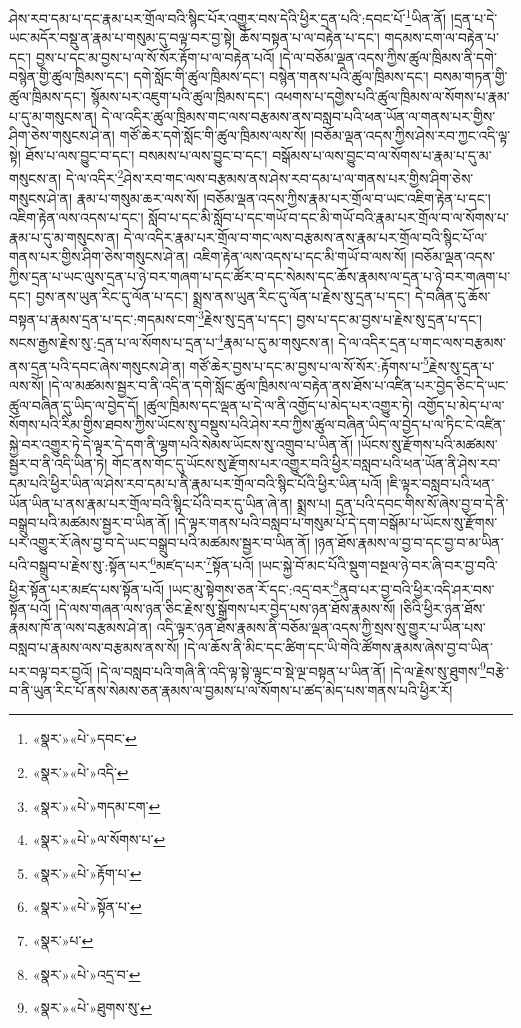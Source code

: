 ཤེས་རབ་དམ་པ་དང་རྣམ་པར་གྲོལ་བའི་སྙིང་པོར་འགྱུར་བས་དེའི་ཕྱིར་དྲན་པའི་:དབང་པོ་\footnote{«སྣར་»«པེ་»དབང་}ཡིན་ནོ། །དྲན་པ་དེ་ཡང་མདོར་བསྡུ་ན་རྣམ་པ་གསུམ་དུ་བལྟ་བར་བྱ་སྟེ། ཆོས་བསྟན་པ་ལ་བརྟེན་པ་དང་། གདམས་ངག་ལ་བརྟེན་པ་དང་། བྱས་པ་དང་མ་བྱས་པ་ལ་སོ་སོར་རྟོག་པ་ལ་བརྟེན་པའོ། །དེ་ལ་བཅོམ་ལྡན་འདས་ཀྱིས་ཚུལ་ཁྲིམས་ནི་དགེ་བསྙེན་གྱི་ཚུལ་ཁྲིམས་དང་། དགེ་སློང་གི་ཚུལ་ཁྲིམས་དང་། བསྙེན་གནས་པའི་ཚུལ་ཁྲིམས་དང་། བསམ་གཏན་གྱི་ཚུལ་ཁྲིམས་དང་། སྙོམས་པར་འཇུག་པའི་ཚུལ་ཁྲིམས་དང་། འཕགས་པ་དགྱེས་པའི་ཚུལ་ཁྲིམས་ལ་སོགས་པ་རྣམ་པ་དུ་མ་གསུངས་ན། དེ་ལ་འདིར་ཚུལ་ཁྲིམས་གང་ལས་བརྩམས་ནས་བསླབ་པའི་ཕན་ཡོན་ལ་གནས་པར་གྱིས་ཤིག་ཅེས་གསུངས་ཤེ་ན། གཙོ་ཆེར་དགེ་སློང་གི་ཚུལ་ཁྲིམས་ལས་སོ། །བཅོམ་ལྡན་འདས་ཀྱིས་ཤེས་རབ་ཀྱང་འདི་ལྟ་སྟེ། ཐོས་པ་ལས་བྱུང་བ་དང་། བསམས་པ་ལས་བྱུང་བ་དང་། བསྒོམས་པ་ལས་བྱུང་བ་ལ་སོགས་པ་རྣམ་པ་དུ་མ་གསུངས་ན། དེ་ལ་འདིར་\footnote{«སྣར་»«པེ་»འདི་}ཤེས་རབ་གང་ལས་བརྩམས་ནས་ཤེས་རབ་དམ་པ་ལ་གནས་པར་གྱིས་ཤིག་ཅེས་གསུངས་ཤེ་ན། རྣམ་པ་གསུམ་ཆར་ལས་སོ། །བཅོམ་ལྡན་འདས་ཀྱིས་རྣམ་པར་གྲོལ་བ་ཡང་འཇིག་རྟེན་པ་དང་། འཇིག་རྟེན་ལས་འདས་པ་དང་། སློབ་པ་དང་མི་སློབ་པ་དང་གཡོ་བ་དང་མི་གཡོ་བའི་རྣམ་པར་གྲོལ་བ་ལ་སོགས་པ་རྣམ་པ་དུ་མ་གསུངས་ན། དེ་ལ་འདིར་རྣམ་པར་གྲོལ་བ་གང་ལས་བརྩམས་ནས་རྣམ་པར་གྲོལ་བའི་སྙིང་པོ་ལ་གནས་པར་གྱིས་ཤིག་ཅེས་གསུངས་ཤེ་ན། འཇིག་རྟེན་ལས་འདས་པ་དང་མི་གཡོ་བ་ལས་སོ། །བཅོམ་ལྡན་འདས་ཀྱིས་དྲན་པ་ཡང་ལུས་དྲན་པ་ཉེ་བར་གཞག་པ་དང་ཚོར་བ་དང་སེམས་དང་ཆོས་རྣམས་ལ་དྲན་པ་ཉེ་བར་གཞག་པ་དང་། བྱས་ནས་ཡུན་རིང་དུ་ལོན་པ་དང་། སྨྲས་ནས་ཡུན་རིང་དུ་ལོན་པ་རྗེས་སུ་དྲན་པ་དང་། དེ་བཞིན་དུ་ཆོས་བསྟན་པ་རྣམས་དྲན་པ་དང་:གདམས་ངག་\footnote{«སྣར་»«པེ་»གདམ་ངག་}རྗེས་སུ་དྲན་པ་དང་། བྱས་པ་དང་མ་བྱས་པ་རྗེས་སུ་དྲན་པ་དང་། སངས་རྒྱས་རྗེས་སུ་:དྲན་པ་ལ་སོགས་པ་དྲན་པ་\footnote{«སྣར་»«པེ་»ལ་སོགས་པ་}རྣམ་པ་དུ་མ་གསུངས་ན། དེ་ལ་འདིར་དྲན་པ་གང་ལས་བརྩམས་ནས་དྲན་པའི་དབང་ཞེས་གསུངས་ཤེ་ན། གཙོ་ཆེར་བྱས་པ་དང་མ་བྱས་པ་ལ་སོ་སོར་:རྟོགས་པ་\footnote{«སྣར་»«པེ་»རྟོག་པ་}རྗེས་སུ་དྲན་པ་ལས་སོ། །དེ་ལ་མཚམས་སྦྱར་བ་ནི་འདི་ན་དགེ་སློང་ཚུལ་ཁྲིམས་ལ་བརྟེན་ནས་ཐོས་པ་འཛིན་པར་བྱེད་ཅིང་དེ་ཡང་ཚུལ་བཞིན་དུ་ཡིད་ལ་བྱེད་དོ། །ཚུལ་ཁྲིམས་དང་ལྡན་པ་དེ་ལ་ནི་འགྱོད་པ་མེད་པར་འགྱུར་ཏེ། འགྱོད་པ་མེད་པ་ལ་སོགས་པའི་རིམ་གྱིས་ཐབས་ཀྱིས་ཡོངས་སུ་བསྡུས་པའི་ཤེས་རབ་ཀྱིས་ཚུལ་བཞིན་ཡིད་ལ་བྱེད་པ་ལ་ཏིང་ངེ་འཛིན་སྐྱེ་བར་འགྱུར་ཏེ་དེ་ལྟར་དེ་དག་ནི་ལྷག་པའི་སེམས་ཡོངས་སུ་འགྲུབ་པ་ཡིན་ནོ། །ཡོངས་སུ་རྫོགས་པའི་མཚམས་སྦྱར་བ་ནི་འདི་ཡིན་ཏེ། གོང་ནས་གོང་དུ་ཡོངས་སུ་རྫོགས་པར་འགྱུར་བའི་ཕྱིར་བསླབ་པའི་ཕན་ཡོན་ནི་ཤེས་རབ་དམ་པའི་ཕྱིར་ཡིན་ལ་ཤེས་རབ་དམ་པ་ནི་རྣམ་པར་གྲོལ་བའི་སྙིང་པོའི་ཕྱིར་ཡིན་པའོ། །ཇི་ལྟར་བསླབ་པའི་ཕན་ཡོན་ཡིན་པ་ནས་རྣམ་པར་གྲོལ་བའི་སྙིང་པོའི་བར་དུ་ཡིན་ཞེ་ན། སྨྲས་པ། དྲན་པའི་དབང་གིས་སོ་ཞེས་བྱ་བ་དེ་ནི་བསྒྲུབ་པའི་མཚམས་སྦྱར་བ་ཡིན་ནོ། །དེ་ལྟར་གནས་པའི་བསླབ་པ་གསུམ་པོ་དེ་དག་བསྒོམ་པ་ཡོངས་སུ་རྫོགས་པར་འགྱུར་རོ་ཞེས་བྱ་བ་དེ་ཡང་བསྒྲུབ་པའི་མཚམས་སྦྱར་བ་ཡིན་ནོ། །ཉན་ཐོས་རྣམས་ལ་བྱ་བ་དང་བྱ་བ་མ་ཡིན་པའི་བསྒྲུབ་པ་རྗེས་སུ་:སྟོན་པར་\footnote{«སྣར་»«པེ་»སྟོན་པ་}མཛད་པར་\footnote{«སྣར་»པ་}སྟོན་པའོ། །ཡང་སྐྱེ་བོ་མང་པོའི་སྡུག་བསྔལ་ཉེ་བར་ཞི་བར་བྱ་བའི་ཕྱིར་སྟོན་པར་མཛད་པས་སྟོན་པའོ། །ཡང་མུ་སྟེགས་ཅན་རོ་དང་:འདྲ་བར་\footnote{«སྣར་»«པེ་»འདྲ་བ་}ནུབ་པར་བྱ་བའི་ཕྱིར་འདི་ཤར་བས་སྟོན་པའོ། །དེ་ལས་གཞན་ལས་ཉན་ཅིང་རྗེས་སུ་སྒྲོགས་པར་བྱེད་པས་ཉན་ཐོས་རྣམས་སོ། །ཅིའི་ཕྱིར་ཉན་ཐོས་རྣམས་ཁོ་ན་ལས་བརྩམས་ཤེ་ན། འདི་ལྟར་ཉན་ཐོས་རྣམས་ནི་བཅོམ་ལྡན་འདས་ཀྱི་སྲས་སུ་གྱུར་པ་ཡིན་པས་བསླབ་པ་རྣམས་ལས་བརྩམས་ནས་སོ། །དེ་ལ་ཆོས་ནི་མིང་དང་ཚིག་དང་ཡི་གེའི་ཚོགས་རྣམས་ཞེས་བྱ་བ་ཡིན་པར་བལྟ་བར་བྱའོ། །དེ་ལ་བསླབ་པའི་གཞི་ནི་འདི་ལྟ་སྟེ་ལྟུང་བ་སྡེ་ལྔ་བསྟན་པ་ཡིན་ནོ། །དེ་ལ་རྗེས་སུ་ཐུགས་\footnote{«སྣར་»«པེ་»ཐུགས་སུ་}བརྩེ་བ་ནི་ཡུན་རིང་པོ་ནས་སེམས་ཅན་རྣམས་ལ་བྱམས་པ་ལ་སོགས་པ་ཚད་མེད་པས་གནས་པའི་ཕྱིར་རོ། 
